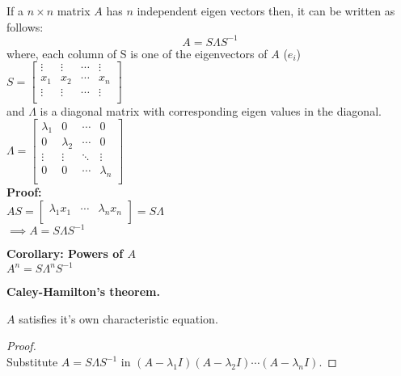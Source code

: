 If a $n \times n$ matrix $A$ has $n$ independent eigen vectors then, it can be written as follows: 
$$A = S\Lambda S^{-1} $$ 
where, each column of S is one of the eigenvectors of $A$ ($e_i$)\\
$S = 
\begin{bmatrix}
\vdots & \vdots & \cdots & \vdots\\
x_1 & x_2 & \cdots & x_n\\
\vdots & \vdots & \cdots & \vdots\\
\end{bmatrix}
$\\
and $\Lambda$ is a diagonal matrix with corresponding eigen values in the diagonal.\\
$\Lambda = 
\begin{bmatrix}
\lambda_1 & 0 & \cdots & 0\\
0 & \lambda_2 & \cdots & 0\\
\vdots & \vdots & \ddots & \vdots\\
0 & 0 & \cdots & \lambda_n\\
\end{bmatrix}
$\\



\textbf{Proof:}\\

$AS = 
\begin{bmatrix}
\lambda_1 x_1 & \cdots & \lambda_n x_n\\	
\end{bmatrix}
= S\Lambda
$\\
$\implies A = S\Lambda S^{-1}$

\vspace{6pt}

\textbf{Corollary: Powers of $A$}\\
$A^n = S\Lambda ^n S^{-1}$

\begin{mdframed}[backgroundcolor=blue!10,linecolor=blue]
\begin{center}
\textbf{Caley-Hamilton's theorem.}	
\end{center}
\begin{theorem}[]
$A$ satisfies it's own characteristic equation.
\begin{proof}
\hspace{5pt}\\
Substitute $A = S\Lambda S^{-1}$ in $(A -\lambda_1 I)(A - \lambda_2 I)\cdots(A - \lambda_n I)$.
\end{proof}
\end{theorem}
\end{mdframed}



